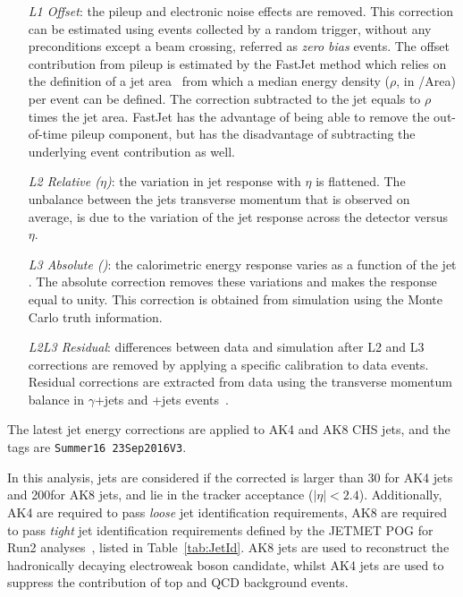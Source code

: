 \begin{itemize}
  \item[\emph{L1 Offset}:] the pileup and electronic noise effects are removed. This correction can be estimated using events collected by a random trigger, without any preconditions except a beam crossing, referred as \emph{zero bias} events. The offset contribution from pileup is estimated by the FastJet method which relies on the definition of a jet area~\cite{bib:fastjet} from which a median energy density ($\rho$, in \GeV/Area) per event can be defined. The correction subtracted to the jet \pt equals to $\rho$ times the jet area. FastJet has the advantage of being able to remove the out-of-time pileup component, but has the disadvantage of subtracting the underlying event contribution as well.
  \item[\emph{L2 Relative ($\eta$)}:] the variation in jet response with $\eta$ is flattened. The unbalance between the jets transverse momentum that is observed on average, is due to the variation of the jet response across the detector versus $\eta$.
  \item[\emph{L3 Absolute (\pt)}:] the calorimetric energy response varies as a function of the jet \pt. The absolute correction removes these variations and makes the response equal to unity. This correction is obtained from simulation using the Monte Carlo truth information.
  \item[\emph{L2L3 Residual}:] differences between data and simulation after L2 and L3 corrections are removed by applying a specific calibration to data events. Residual corrections are extracted from data using the transverse momentum balance in $\gamma$+jets and \Z+jets events~\cite{bib:1748-0221-6-11-P11002}.
\end{itemize}

The latest jet energy corrections are applied to AK4 and AK8 CHS jets, and the tags are {\tt Summer16 23Sep2016V3}.

In this analysis, jets are considered if the corrected \pt is larger than 30 \GeV for AK4 jets and 200\GeV for AK8 jets, and lie in the tracker acceptance ($|\eta|<2.4$). Additionally, AK4 are required to pass \emph{loose} jet identification requirements, AK8 are required to pass \emph{tight} jet identification requirements defined by the JETMET POG for Run2 analyses~\cite{JetMETPOG}, listed in Table~\ref{tab:JetId}. AK8 jets are used to reconstruct the hadronically decaying electroweak boson candidate, whilst AK4 jets are used to suppress the contribution of top and QCD background events.

